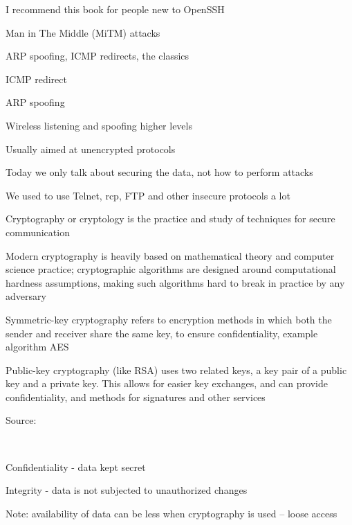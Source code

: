 \documentclass[Screen16to9,17pt]{foils}
\begin{document}

I recommend this book for people new to OpenSSH


\begin{list1}
\item Man in The Middle (MiTM) attacks
\item ARP spoofing, ICMP redirects, the classics
\begin{list2}
\item ICMP redirect
\item ARP spoofing
\item Wireless listening and spoofing higher levels
\end{list2}
\item Usually aimed at unencrypted protocols
\item Today we only talk about securing the data, not how to perform attacks
\item We used to use Telnet, rcp, FTP and other insecure protocols a lot
\end{list1}



\begin{list1}
\item Cryptography or cryptology is the practice and study of techniques for secure communication
\item Modern cryptography is heavily based on mathematical theory and computer science practice; cryptographic algorithms are designed around computational hardness assumptions, making such algorithms hard to break in practice by any adversary
\item Symmetric-key cryptography refers to encryption methods in which both the sender and receiver share the same key, to ensure confidentiality, example algorithm AES
\item Public-key cryptography (like RSA) uses two related keys, a key pair of a public key and a private key. This allows for easier key exchanges, and can provide confidentiality, and methods for signatures and other services
\end{list1}

Source: 



{~}

\begin{list2}
\item Confidentiality - data kept secret
\item Integrity - data is not subjected to unauthorized changes
\item Note: availability of data can be less when cryptography is used -- loose access
\end{list2}
\end{document}
